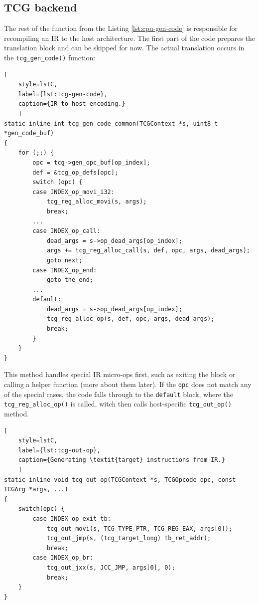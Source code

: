 \pagebreak
\subsection{TCG backend}

The rest of the function from the Listing \ref{lst:cpu-gen-code} is responsible for recompiling an IR to the host architecture.
The first part of the code prepares the translation block and can be skipped for now. The actual translation occurs
in the \texttt{tcg\_gen\_code()} function:

\begin{lstlisting}[
    style=lstC,
    label={lst:tcg-gen-code},
    caption={IR to host encoding.}
    ]
static inline int tcg_gen_code_common(TCGContext *s, uint8_t *gen_code_buf)
{
    for (;;) {
        opc = tcg->gen_opc_buf[op_index];
        def = &tcg_op_defs[opc];
        switch (opc) {
        case INDEX_op_movi_i32:
            tcg_reg_alloc_movi(s, args);
            break;
        ...
        case INDEX_op_call:
            dead_args = s->op_dead_args[op_index];
            args += tcg_reg_alloc_call(s, def, opc, args, dead_args);
            goto next;
        case INDEX_op_end:
            goto the_end;
        ...
        default:
            dead_args = s->op_dead_args[op_index];
            tcg_reg_alloc_op(s, def, opc, args, dead_args);
            break;
        }
    }
}
\end{lstlisting}

\noindent
This method handles special IR micro-ops first, such as exiting the block or calling a helper function (more about them
later). If the \texttt{opc} does not match any of the special cases, the code falls through to the \texttt{default}
block, where the \texttt{tcg\_reg\_alloc\_op()} is called, witch then calls host-specific \texttt{tcg\_out\_op()} method.

\begin{lstlisting}[
    style=lstC,
    label={lst:tcg-out-op},
    caption={Generating \textit{target} instructions from IR.}
    ]
static inline void tcg_out_op(TCGContext *s, TCGOpcode opc, const TCGArg *args, ...)
{
    switch(opc) {
        case INDEX_op_exit_tb:
            tcg_out_movi(s, TCG_TYPE_PTR, TCG_REG_EAX, args[0]);
            tcg_out_jmp(s, (tcg_target_long) tb_ret_addr);
            break;
        case INDEX_op_br:
            tcg_out_jxx(s, JCC_JMP, args[0], 0);
            break;
    }
}
\end{lstlisting}

